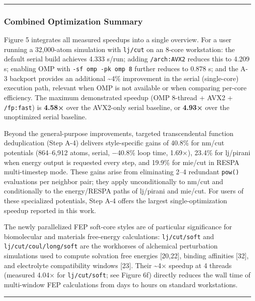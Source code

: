 \documentclass[
  11pt,
]{article}
\begin{document}
\begin{center}\rule{0.5\linewidth}{0.5pt}\end{center}

\subsubsection{Combined Optimization
Summary}\label{combined-optimization-summary}

Figure 5 integrates all measured speedups into a single overview. For a
user running a 32,000-atom simulation with \texttt{lj/cut} on an 8-core
workstation: the default serial build achieves 4.333 s/run; adding
\texttt{/arch:AVX2} reduces this to 4.209 s; enabling OMP with
\texttt{-sf\ omp\ -pk\ omp\ 8} further reduces to 0.878 s; and the A-3
backport provides an additional \textasciitilde4\% improvement in the
serial (single-core) execution path, relevant when OMP is not available
or when comparing per-core efficiency. The maximum demonstrated speedup
(OMP 8-thread + AVX2 + \texttt{/fp:fast}) is \textbf{4.58×} over the
AVX2-only serial baseline, or \textbf{4.93×} over the unoptimized serial
baseline.

Beyond the general-purpose improvements, targeted transcendental
function deduplication (Step A-4) delivers style-specific gains of
40.8\% for nm/cut potentials (864--6,912 atoms, serial, −40.8\% loop
time, 1.69×), 23.4\% for lj/pirani when energy output is requested every
step, and 19.9\% for mie/cut in RESPA multi-timestep mode. These gains
arise from eliminating 2--4 redundant \texttt{pow()} evaluations per
neighbor pair; they apply unconditionally to nm/cut and conditionally to
the energy/RESPA paths of lj/pirani and mie/cut. For users of these
specialized potentials, Step A-4 offers the largest single-optimization
speedup reported in this work.

The newly parallelized FEP soft-core styles are of particular
significance for biomolecular and materials free-energy calculations:
\texttt{lj/cut/soft} and \texttt{lj/cut/coul/long/soft} are the
workhorses of alchemical perturbation simulations used to compute
solvation free energies {[}20,22{]}, binding affinities {[}32{]}, and
electrolyte compatibility windows {[}23{]}. Their \textasciitilde4×
speedup at 4 threads (measured 4.04× for \texttt{lj/cut/soft}; see
Figure 6f) directly reduces the wall time of multi-window FEP
calculations from days to hours on standard workstations.

\begin{center}\rule{0.5\linewidth}{0.5pt}\end{center}
\end{document}
